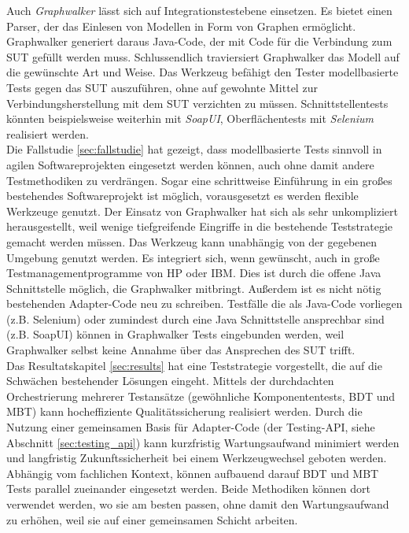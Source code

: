 Auch \textit{Graphwalker} lässt sich auf Integrationstestebene einsetzen. Es bietet einen Parser, der das Einlesen von Modellen in Form von Graphen ermöglicht. Graphwalker generiert daraus Java-Code, der mit Code für die Verbindung zum \Gls{SUT} gefüllt werden muss. Schlussendlich traviersiert Graphwalker das Modell auf die gewünschte Art und Weise. Das Werkzeug befähigt den Tester modellbasierte Tests gegen das \Gls{SUT} auszuführen, ohne auf gewohnte Mittel zur Verbindungsherstellung mit dem \Gls{SUT} verzichten zu müssen. Schnittstellentests könnten beispielsweise weiterhin mit \textit{SoapUI}, Oberflächentests mit \textit{Selenium} realisiert werden.\\
Die Fallstudie \ref{sec:fallstudie} hat gezeigt, dass modellbasierte Tests sinnvoll in agilen Softwareprojekten eingesetzt werden können, auch ohne damit andere Testmethodiken zu verdrängen. Sogar eine schrittweise Einführung in ein großes bestehendes Softwareprojekt ist möglich, vorausgesetzt es werden flexible Werkzeuge genutzt. Der Einsatz von Graphwalker hat sich als sehr unkompliziert herausgestellt, weil wenige tiefgreifende Eingriffe in die bestehende Teststrategie gemacht werden müssen. Das Werkzeug kann unabhängig von der gegebenen Umgebung genutzt werden. Es integriert sich, wenn gewünscht, auch in große Testmanagementprogramme von HP oder IBM. Dies ist durch die offene Java Schnittstelle möglich, die Graphwalker mitbringt. Außerdem ist es nicht nötig bestehenden Adapter-Code neu zu schreiben. Testfälle die als Java-Code vorliegen (z.B. Selenium) oder zumindest durch eine Java Schnittstelle ansprechbar sind (z.B. SoapUI) können in Graphwalker Tests eingebunden werden, weil Graphwalker selbst keine Annahme über das Ansprechen des \Gls{SUT} trifft.\\
Das Resultatskapitel \ref{sec:results} hat eine Teststrategie vorgestellt, die auf die Schwächen bestehender Lösungen eingeht. Mittels der durchdachten Orchestrierung mehrerer Testansätze (gewöhnliche Komponententests, \Gls{BDT} und \Gls{MBT}) kann hocheffiziente Qualitätssicherung realisiert werden. Durch die Nutzung einer gemeinsamen Basis für Adapter-Code (der Testing-API, siehe Abschnitt \ref{sec:testing_api}) kann kurzfristig Wartungsaufwand minimiert werden und langfristig Zukunftssicherheit bei einem Werkzeugwechsel geboten werden. 
Abhängig vom fachlichen Kontext, können aufbauend darauf \Gls{BDT} und \Gls{MBT} Tests parallel zueinander eingesetzt werden. Beide Methodiken können dort verwendet werden, wo sie am besten passen, ohne damit den Wartungsaufwand zu erhöhen, weil sie auf einer gemeinsamen Schicht arbeiten.\\

